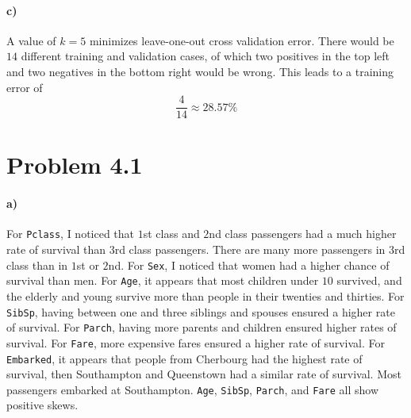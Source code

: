 \documentclass[12pt]{article}
\begin{document}
\paragraph{c)}

A value of \(k=5\) minimizes leave-one-out cross validation error. There would be \(14\) different training and validation cases, of which
two positives in the top left and two negatives in the bottom right would be wrong. This leads to a training error of
\[\frac{4}{14}\approx 28.57\%\]

\section*{Problem 4.1}

\paragraph{a)}

For \texttt{Pclass}, I noticed that \(1\)st class and \(2\)nd class passengers
had a much higher rate of survival than \(3\)rd class passengers. There are many
more passengers in \(3\)rd class than in \(1\)st or \(2\)nd. For \texttt{Sex},
I noticed that women had a  higher chance of survival than men. For \texttt{Age}, it
appears that most children under \(10\) survived, and the elderly and young survive
more than people in their twenties and thirties. For \texttt{SibSp}, having between
one and three siblings and spouses ensured a higher rate of survival. For
\texttt{Parch}, having more parents and children ensured higher rates of survival.
For \texttt{Fare}, more expensive fares ensured a higher rate of survival. For
\texttt{Embarked}, it appears that people from Cherbourg had the highest rate of
survival, then Southampton and Queenstown had a similar rate of survival. Most
passengers embarked at Southampton. \texttt{Age}, \texttt{SibSp}, \texttt{Parch},
and \texttt{Fare} all show positive skews.
\end{document}

